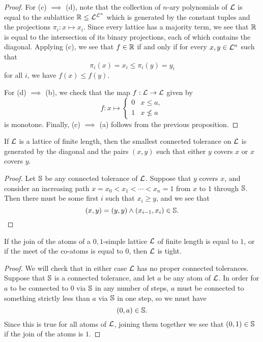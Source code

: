 \begin{appendices}
\begin{proof}
For (c) $\implies$ (d), note that the collection of $n$-ary polynomials of $\mathcal{L}$ is equal to the sublattice $\mathbb{R} \le \mathcal{L}^{\mathcal{L}^n}$ which is generated by the constant tuples and the projections $\pi_i : x \mapsto x_i$. Since every lattice has a majority term, we see that $\mathbb{R}$ is equal to the intersection of its binary projections, each of which contains the diagonal. Applying (c), we see that $f \in \mathbb{R}$ if and only if for every $x, y \in \mathcal{L}^n$ such that
\[
\pi_i(x) = x_i \le \pi_i(y) = y_i
\]
for all $i$, we have $f(x) \le f(y)$.

For (d) $\implies$ (b), we check that the map $f : \mathcal{L} \rightarrow \mathcal{L}$ given by
\[
f : x \mapsto \begin{cases} 0 & x \le a,\\ 1 & x \not\le a \end{cases}
\]
is monotone. Finally, (c) $\implies$ (a) follows from the previous proposition.
\end{proof}

\begin{prop} If $\mathcal{L}$ is a lattice of finite length, then the smallest connected tolerance on $\mathcal{L}$ is generated by the diagonal and the pairs $(x,y)$ such that either $y$ covers $x$ or $x$ covers $y$.
\end{prop}
\begin{proof} Let $\mathbb{S}$ be any connected tolerance of $\mathcal{L}$. Suppose that $y$ covers $x$, and consider an increasing path $x = x_0 < x_1 < \cdots < x_n = 1$ from $x$ to $1$ through $\mathbb{S}$. Then there must be some first $i$ such that $x_i \ge y$, and we see that
\[
(x,y) = (y,y) \wedge (x_{i-1}, x_i) \in \mathbb{S}.\qedhere
\]
\end{proof}

\begin{prop} If the join of the atoms of a $0,1$-simple lattice $\mathcal{L}$ of finite length is equal to $1$, or if the meet of the co-atoms is equal to $0$, then $\mathcal{L}$ is tight.
\end{prop}
\begin{proof} We will check that in either case $\mathcal{L}$ has no proper connected tolerances. Suppose that $\mathbb{S}$ is a connected tolerance, and let $a$ be any atom of $\mathcal{L}$. In order for $a$ to be connected to $0$ via $\mathbb{S}$ in any number of steps, $a$ must be connected to something strictly less than $a$ via $\mathbb{S}$ in one step, so we must have
\[
(0,a) \in \mathbb{S}.
\]
Since this is true for all atoms of $\mathcal{L}$, joining them together we see that $(0,1) \in \mathbb{S}$ if the join of the atoms is $1$.
\end{proof}


\end{appendices}

